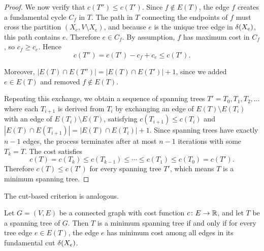 \begin{proof}
We now verify that $c(T'') \leq c(T')$.
Since $f \notin E(T)$, the edge $f$ creates a fundamental cycle $C_f$ in $T$.
The path in $T$ connecting the endpoints of $f$ must cross the partition $(X_e, V \setminus X_e)$, and because $e$ is the unique tree edge in $\delta(X_e)$, this path contains $e$.
Therefore $e \in C_f$.
By assumption, $f$ has maximum cost in $C_f$, so $c_f \geq c_e$.
Hence
\[
c(T'') = c(T') - c_f + c_e \leq c(T').
\]

Moreover, $|E(T) \cap E(T'')| = |E(T) \cap E(T')| + 1$, since we added $e \in E(T)$ and removed $f \notin E(T)$.

Repeating this exchange, we obtain a sequence of spanning trees $T' = T_0, T_1, T_2, \ldots$ where each $T_{i+1}$ is derived from $T_i$ by exchanging an edge of $E(T) \setminus E(T_i)$ with an edge of $E(T_i) \setminus E(T)$, satisfying $c(T_{i+1}) \leq c(T_i)$ and $|E(T) \cap E(T_{i+1})| = |E(T) \cap E(T_i)| + 1$.
Since spanning trees have exactly $n - 1$ edges, the process terminates after at most $n - 1$ iterations with some $T_k = T$.
The cost satisfies
\[
c(T) = c(T_k) \leq c(T_{k-1}) \leq \cdots \leq c(T_1) \leq c(T_0) = c(T').
\]
Therefore $c(T) \leq c(T')$ for every spanning tree $T'$, which means $T$ is a minimum spanning tree.
\end{proof}

The cut-based criterion is analogous.

\begin{theorem}\label{thm:cut-criterion}
Let $G = (V, E)$ be a connected graph with cost function $c \colon E \to \mathbb{R}$, and let $T$ be a spanning tree of $G$.
Then $T$ is a minimum spanning tree if and only if for every tree edge $e \in E(T)$, the edge $e$ has minimum cost among all edges in its fundamental cut $\delta(X_e)$.
\end{theorem}

